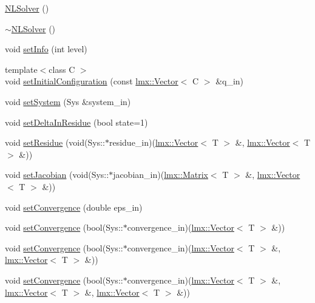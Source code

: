 \begin{DoxyCompactItemize}
\item 
\hyperlink{classlmx_1_1NLSolver_a403859fcc0b6e85464243ea23c552f68}{N\-L\-Solver} ()
\item 
\hyperlink{classlmx_1_1NLSolver_a5460815aa8d0f067fcb650871ab8f964}{$\sim$\-N\-L\-Solver} ()
\item 
void \hyperlink{classlmx_1_1NLSolver_a39a943c3a151c4b4d10cd429c1457038}{set\-Info} (int level)
\item 
{\footnotesize template$<$class C $>$ }\\void \hyperlink{classlmx_1_1NLSolver_a01237e26f4df6145f5f27c059f71878a}{set\-Initial\-Configuration} (const \hyperlink{classlmx_1_1Vector}{lmx\-::\-Vector}$<$ C $>$ \&q\-\_\-in)
\item 
void \hyperlink{classlmx_1_1NLSolver_a4ae05d136ecb91323840ad8978203ed0}{set\-System} (Sys \&system\-\_\-in)
\item 
void \hyperlink{classlmx_1_1NLSolver_a01792e660c969643a23b1547429cc63e}{set\-Delta\-In\-Residue} (bool state=1)
\item 
void \hyperlink{classlmx_1_1NLSolver_a9794630d37fe7463b1ab9e4cbe6914cb}{set\-Residue} (void(Sys\-::$\ast$residue\-\_\-in)(\hyperlink{classlmx_1_1Vector}{lmx\-::\-Vector}$<$ T $>$ \&, \hyperlink{classlmx_1_1Vector}{lmx\-::\-Vector}$<$ T $>$ \&))
\item 
void \hyperlink{classlmx_1_1NLSolver_a8b448fdf2f56d4a4e0ca751fc87151c9}{set\-Jacobian} (void(Sys\-::$\ast$jacobian\-\_\-in)(\hyperlink{classlmx_1_1Matrix}{lmx\-::\-Matrix}$<$ T $>$ \&, \hyperlink{classlmx_1_1Vector}{lmx\-::\-Vector}$<$ T $>$ \&))
\item 
void \hyperlink{classlmx_1_1NLSolver_acf245c525c2ddbfd8f64e7f98854cf37}{set\-Convergence} (double eps\-\_\-in)
\item 
void \hyperlink{classlmx_1_1NLSolver_a436576e5e3f62396ec36845528f4c3d3}{set\-Convergence} (bool(Sys\-::$\ast$convergence\-\_\-in)(\hyperlink{classlmx_1_1Vector}{lmx\-::\-Vector}$<$ T $>$ \&))
\item 
void \hyperlink{classlmx_1_1NLSolver_aac508bdd31eae153f3ffb2d18ebcf371}{set\-Convergence} (bool(Sys\-::$\ast$convergence\-\_\-in)(\hyperlink{classlmx_1_1Vector}{lmx\-::\-Vector}$<$ T $>$ \&, \hyperlink{classlmx_1_1Vector}{lmx\-::\-Vector}$<$ T $>$ \&))
\item 
void \hyperlink{classlmx_1_1NLSolver_a372b8c898ea4fe6b0bd17e4acf8474be}{set\-Convergence} (bool(Sys\-::$\ast$convergence\-\_\-in)(\hyperlink{classlmx_1_1Vector}{lmx\-::\-Vector}$<$ T $>$ \&, \hyperlink{classlmx_1_1Vector}{lmx\-::\-Vector}$<$ T $>$ \&, \hyperlink{classlmx_1_1Vector}{lmx\-::\-Vector}$<$ T $>$ \&))

\end{DoxyCompactItemize}
